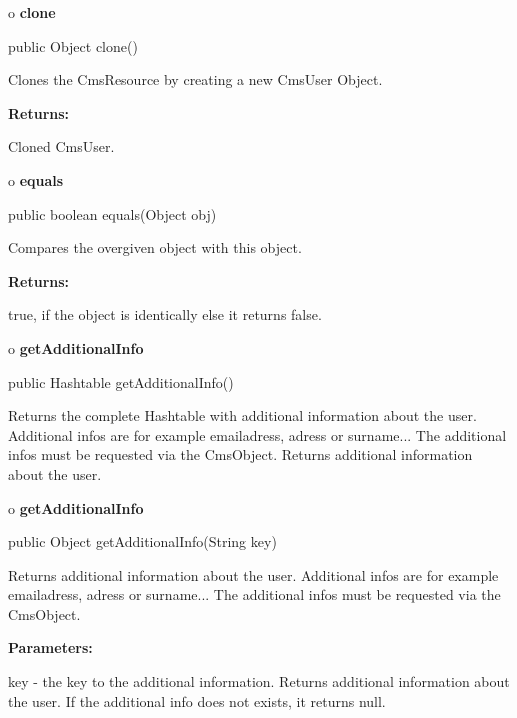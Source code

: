 o {\bf clone} 

\begin{PRE}
 public Object clone()
\end{PRE}

\begin{description}
\htmlDD Clones the CmsResource by creating a new CmsUser Object. 

\begin{description}
\item {\bf Returns:}  

Cloned CmsUser.  
\end{description}

\end{description}

o {\bf equals} 

\begin{PRE}
 public boolean equals(Object obj)
\end{PRE}

\begin{description}
\htmlDD Compares the overgiven object with this object. 

\begin{description}
\item {\bf Returns:}  

true, if the object is identically else it returns false.  
\end{description}

\end{description}

o {\bf getAdditionalInfo} 

\begin{PRE}
 public Hashtable getAdditionalInfo()
\end{PRE}

\begin{description}
\htmlDD Returns the complete Hashtable with additional information about the
user. Additional infos are for example emailadress, adress or surname... The
additional infos must be requested via the CmsObject. Returns additional
information about the user. 

\end{description}

o {\bf getAdditionalInfo} 

\begin{PRE}
 public Object getAdditionalInfo(String key)
\end{PRE}

\begin{description}
\htmlDD Returns additional information about the user. Additional infos are
for example emailadress, adress or surname... The additional infos must be
requested via the CmsObject. 

\begin{description}
\item {\bf Parameters:}  

key - the key to the additional information. Returns additional information
about the user. If the additional info does not exists, it returns null.  
\end{description}

\end{description}

